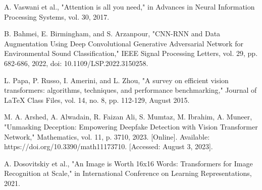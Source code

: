 \begin{thebibliography}{99}
        \item\label{ref9} A. Vaswani et al., "Attention is all you need," in Advances in Neural Information Processing Systems, vol. 30, 2017.
        
        \item\label{ref10} B. Bahmei, E. Birmingham, and S. Arzanpour, "CNN-RNN and Data Augmentation Using Deep Convolutional Generative Adversarial Network for Environmental Sound Classification," IEEE Signal Processing Letters, vol. 29, pp. 682-686, 2022, doi: 10.1109/LSP.2022.3150258.
        
        \item\label{ref11} L. Papa, P. Russo, I. Amerini, and L. Zhou, "A survey on efficient vision transformers: algorithms, techniques, and performance benchmarking," Journal of LaTeX Class Files, vol. 14, no. 8, pp. 112-129, August 2015.
        
        \item\label{ref12} M. A. Arshed, A. Alwadain, R. Faizan Ali, S. Mumtaz, M. Ibrahim, A. Muneer, "Unmasking Deception: Empowering Deepfake Detection with Vision Transformer Network," Mathematics, vol. 11, p. 3710, 2023. [Online]. Available: https://doi.org/10.3390/math11173710. [Accessed: August 3, 2023].
        
        \item\label{ref13} A. Dosovitskiy et al., "An Image is Worth 16x16 Words: Transformers for Image Recognition at Scale," in International Conference on Learning Representations, 2021.
        
        
\end{thebibliography}
